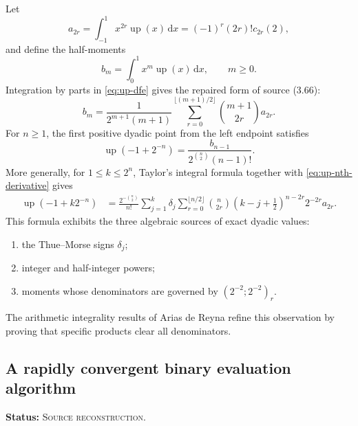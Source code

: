 \documentclass[11pt,oneside]{article}
\theoremstyle{definition}
\theoremstyle{remark}
\newcommand{\Up}{\operatorname{up}}
\newcommand{\dd}{\,\mathrm{d}}
\newcommand{\SourceStatus}{\textcolor{SourceBlue}{\textsc{Source reconstruction}}}
\newcommand{\status}[1]{\par\smallskip\noindent\textbf{Status:} #1.\par\smallskip}
\begin{document}
Let
\begin{equation}
  a_{2r}=\int_{-1}^{1}x^{2r}\Up(x)\dd x
  =(-1)^r(2r)!c_{2r}(2),
  \label{eq:up-even-moments}
\end{equation}
and define the half-moments
\begin{equation}
  b_m=\int_{0}^{1}x^m\Up(x)\dd x,
  \qquad m\ge0.
  \label{eq:b-moments}
\end{equation}
Integration by parts in \eqref{eq:up-dfe} gives the repaired form of source (3.66):
\begin{equation}
  b_m=\frac{1}{2^{m+1}(m+1)}
  \sum_{r=0}^{\lfloor(m+1)/2\rfloor}
     \binom{m+1}{2r}a_{2r}.
  \label{eq:b-from-a}
\end{equation}
For \(n\ge1\), the first positive dyadic point from the left endpoint satisfies
\begin{equation}
  \Up(-1+2^{-n})
    =\frac{b_{n-1}}{2^{\binom n2}(n-1)!}.
  \label{eq:first-dyadic-value}
\end{equation}
More generally, for \(1\le k\le2^n\), Taylor's integral formula together with \eqref{eq:up-nth-derivative} gives
\begin{align}
 \Up(-1+k2^{-n})
 &=\frac{2^{-\binom n2}}{n!}
 \sum_{j=1}^{k}\delta_j
 \sum_{r=0}^{\lfloor n/2\rfloor}
   \binom n{2r}
   \left(k-j+\frac12\right)^{n-2r}
   2^{-2r}a_{2r}.
 \label{eq:all-dyadic-values}
\end{align}
This formula exhibits the three algebraic sources of exact dyadic values:
\begin{enumerate}
  \item the Thue--Morse signs \(\delta_j\);
  \item integer and half-integer powers;
  \item moments whose denominators are governed by \((2^{-2};2^{-2})_r\).
\end{enumerate}
The arithmetic integrality results of Arias de Reyna refine this observation by proving that specific products clear all denominators.

\subsection{A rapidly convergent binary evaluation algorithm}
\status{\SourceStatus}
\end{document}

